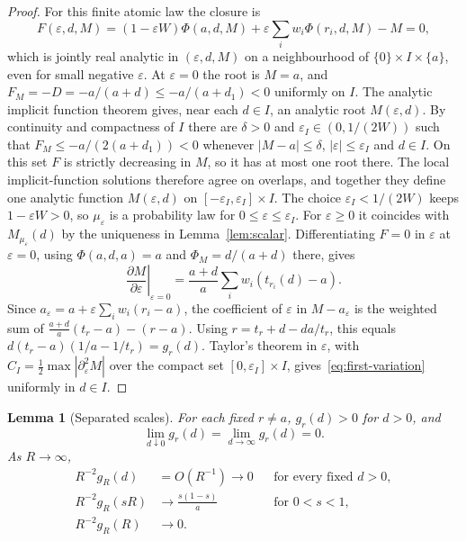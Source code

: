\documentclass[11pt]{article}
\newtheorem{lemma}[theorem]{Lemma}
\theoremstyle{remark}
\begin{document}
\begin{proof}
For this finite atomic law the closure is
\[
 F(\varepsilon,d,M)=(1-\varepsilon W)\Phi(a,d,M)
 +\varepsilon\sum_iw_i\Phi(r_i,d,M)-M=0,
\]
which is jointly real analytic in \((\varepsilon,d,M)\) on a neighbourhood
of \(\{0\}\times I\times\{a\}\), even for small negative \(\varepsilon\).
At \(\varepsilon=0\) the root is \(M=a\), and
\(F_M=-D=-a/(a+d)\le-a/(a+d_1)<0\) uniformly on \(I\). The analytic
implicit function theorem gives, near each \(d\in I\), an analytic root
\(M(\varepsilon,d)\). By continuity and compactness of \(I\) there are
\(\delta>0\) and \(\varepsilon_I\in(0,1/(2W))\) such that
\(F_M\le-a/(2(a+d_1))<0\) whenever \(|M-a|\le\delta\),
\(|\varepsilon|\le\varepsilon_I\) and \(d\in I\). On this set \(F\) is
strictly decreasing in \(M\), so it has at most one root there. The local
implicit-function solutions therefore agree on overlaps, and together they
define one analytic function \(M(\varepsilon,d)\) on
\([-\varepsilon_I,\varepsilon_I]\times I\). The choice
\(\varepsilon_I<1/(2W)\) keeps \(1-\varepsilon W>0\), so \(\mu_\varepsilon\) is a
probability law for \(0\le\varepsilon\le\varepsilon_I\).
For \(\varepsilon\ge0\) it coincides with \(M_{\mu_\varepsilon}(d)\) by the
uniqueness in Lemma~\ref{lem:scalar}. Differentiating \(F=0\) in
\(\varepsilon\) at \(\varepsilon=0\), using \(\Phi(a,d,a)=a\) and
\(\Phi_M=d/(a+d)\) there, gives
\[
 \left.\frac{\partial M}{\partial\varepsilon}\right|_{\varepsilon=0}
 =\frac{a+d}{a}\sum_iw_i(t_{r_i}(d)-a).
\]
Since \(a_\varepsilon=a+\varepsilon\sum_iw_i(r_i-a)\), the coefficient of
\(\varepsilon\) in \(M-a_\varepsilon\) is the weighted sum of
\(\frac{a+d}{a}(t_r-a)-(r-a)\). Using \(r=t_r+d-da/t_r\), this equals
\(d(t_r-a)(1/a-1/t_r)=g_r(d)\). Taylor's theorem in \(\varepsilon\), with
\(C_I=\tfrac12\max|\partial_\varepsilon^2M|\) over the compact set
\([0,\varepsilon_I]\times I\), gives~\eqref{eq:first-variation} uniformly
in \(d\in I\).
\end{proof}

\begin{lemma}[Separated scales]\label{lem:scales}
For each fixed \(r\ne a\), \(g_r(d)>0\) for \(d>0\), and
\[
 \lim_{d\downarrow0}g_r(d)=\lim_{d\to\infty}g_r(d)=0.
\]
As \(R\to\infty\),
\begin{align}
 R^{-2}g_R(d)&=O(R^{-1})\longrightarrow0
                 &&\text{for every fixed }d>0,\label{eq:fixed-scale}\\
 R^{-2}g_R(sR)&\longrightarrow\frac{s(1-s)}a
                 &&\text{for }0<s<1,\label{eq:peak-scale}\\
 R^{-2}g_R(R)&\longrightarrow0.\label{eq:end-scale}
\end{align}
\end{lemma}
\end{document}

